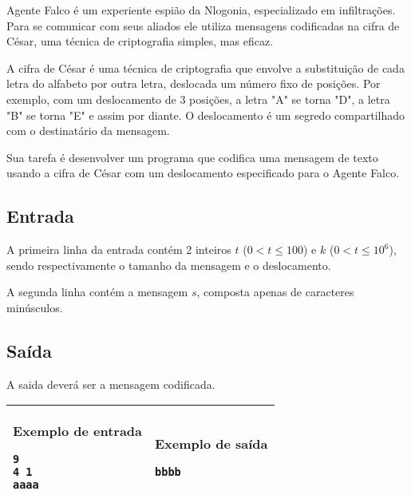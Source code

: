 Agente Falco é um experiente espião da Nlogonia, especializado em infiltrações. Para se comunicar com seus aliados ele utiliza mensagens codificadas na cifra de César, uma técnica de criptografia simples, mas eficaz.

A cifra de César é uma técnica de criptografia que envolve a substituição de cada letra do alfabeto por outra letra, deslocada um número fixo de posições. Por exemplo, com um deslocamento de 3 posições, a letra "A" se torna "D", a letra "B" se torna "E" e assim por diante. O deslocamento é um segredo compartilhado com o destinatário da mensagem.

Sua tarefa é desenvolver um programa que codifica uma mensagem de texto usando a cifra de César com um deslocamento especificado para o Agente Falco.
\subsection*{Entrada}
 
A primeira linha da entrada  contém 2 inteiros $t$ ($0 < t \leq 100$) e $k$ ($0 < t \leq 10^6$), sendo respectivamente o tamanho da mensagem e o deslocamento.
 
A segunda linha contém a mensagem $s$, composta apenas de caracteres minúsculos.
 
\subsection*{Saída}
A saida deverá ser a mensagem codificada.

\begin{table}[!h]
\centering
\begin{tabular}{|l|l|}
\hline
\begin{minipage}[t]{3in}
\textbf{Exemplo de entrada}
\begin{verbatim}
9
4 1
aaaa
\end{verbatim}
\vspace{1mm}
\end{minipage}
&
\begin{minipage}[t]{3in}
\textbf{Exemplo de saída}
\begin{verbatim}
bbbb
\end{verbatim}
\vspace{1mm}
\end{minipage} \\
\hline
\end{tabular}
\end{table}

